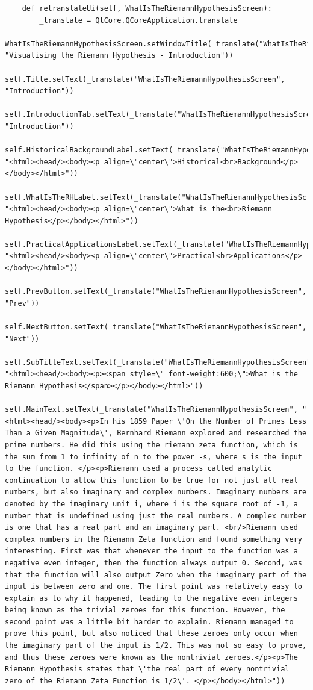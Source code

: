 \documentclass[12pt]{article}
\begin{document}
\begin{lstlisting}
    def retranslateUi(self, WhatIsTheRiemannHypothesisScreen):
        _translate = QtCore.QCoreApplication.translate
        WhatIsTheRiemannHypothesisScreen.setWindowTitle(_translate("WhatIsTheRiemannHypothesisScreen", "Visualising the Riemann Hypothesis - Introduction"))
        self.Title.setText(_translate("WhatIsTheRiemannHypothesisScreen", "Introduction"))
        self.IntroductionTab.setText(_translate("WhatIsTheRiemannHypothesisScreen", "Introduction"))
        self.HistoricalBackgroundLabel.setText(_translate("WhatIsTheRiemannHypothesisScreen", "<html><head/><body><p align=\"center\">Historical<br>Background</p></body></html>"))
        self.WhatIsTheRHLabel.setText(_translate("WhatIsTheRiemannHypothesisScreen", "<html><head/><body><p align=\"center\">What is the<br>Riemann Hypothesis</p></body></html>"))
        self.PracticalApplicationsLabel.setText(_translate("WhatIsTheRiemannHypothesisScreen", "<html><head/><body><p align=\"center\">Practical<br>Applications</p></body></html>"))
        self.PrevButton.setText(_translate("WhatIsTheRiemannHypothesisScreen", "Prev"))
        self.NextButton.setText(_translate("WhatIsTheRiemannHypothesisScreen", "Next"))
        self.SubTitleText.setText(_translate("WhatIsTheRiemannHypothesisScreen", "<html><head/><body><p><span style=\" font-weight:600;\">What is the Riemann Hypothesis</span></p></body></html>"))
        self.MainText.setText(_translate("WhatIsTheRiemannHypothesisScreen", "<html><head/><body><p>In his 1859 Paper \'On the Number of Primes Less Than a Given Magnitude\', Bernhard Riemann explored and researched the prime numbers. He did this using the riemann zeta function, which is the sum from 1 to infinity of n to the power -s, where s is the input to the function. </p><p>Riemann used a process called analytic continuation to allow this function to be true for not just all real numbers, but also imaginary and complex numbers. Imaginary numbers are denoted by the imaginary unit i, where i is the square root of -1, a number that is undefined using just the real numbers. A complex number is one that has a real part and an imaginary part. <br/>Riemann used complex numbers in the Riemann Zeta function and found something very interesting. First was that whenever the input to the function was a negative even integer, then the function always output 0. Second, was that the function will also output Zero when the imaginary part of the input is between zero and one. The first point was relatively easy to explain as to why it happened, leading to the negative even integers being known as the trivial zeroes for this function. However, the second point was a little bit harder to explain. Riemann managed to prove this point, but also noticed that these zeroes only occur when the imaginary part of the input is 1/2. This was not so easy to prove, and thus these zeroes were known as the nontrivial zeroes.</p><p>The Riemann Hypothesis states that \'the real part of every nontrivial zero of the Riemann Zeta Function is 1/2\'. </p></body></html>"))

\end{lstlisting}
\end{document}

